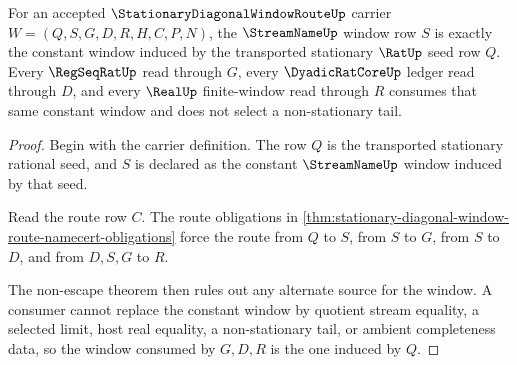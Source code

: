 \begin{theorem}
\label{thm:stationary-diagonal-window-route-constant-window-exactness}
For an accepted $\StationaryDiagonalWindowRouteUp$ carrier $W=(Q,S,G,D,R,H,C,P,N)$, the $\StreamNameUp$ window row $S$ is exactly the constant window induced by the transported stationary $\RatUp$ seed row $Q$. Every $\RegSeqRatUp$ read through $G$, every $\DyadicRatCoreUp$ ledger read through $D$, and every $\RealUp$ finite-window read through $R$ consumes that same constant window and does not select a non-stationary tail.
\end{theorem}
\begin{proof}
Begin with the carrier definition. The row $Q$ is the transported stationary rational seed, and $S$ is declared as the constant $\StreamNameUp$ window induced by that seed.

Read the route row $C$. The route obligations in \autoref{thm:stationary-diagonal-window-route-namecert-obligations} force the route from $Q$ to $S$, from $S$ to $G$, from $S$ to $D$, and from $D,S,G$ to $R$.

The non-escape theorem then rules out any alternate source for the window. A consumer cannot replace the constant window by quotient stream equality, a selected limit, host real equality, a non-stationary tail, or ambient completeness data, so the window consumed by $G,D,R$ is the one induced by $Q$.
\end{proof}

